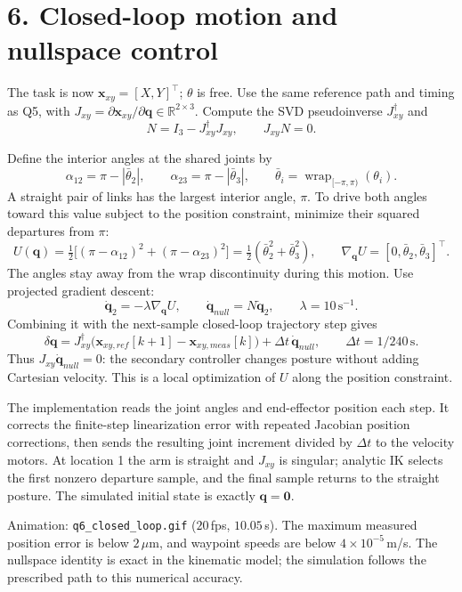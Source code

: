 \documentclass[11pt]{article}
\begin{document}
\newpage
\section*{6. Closed-loop motion and nullspace control}
The task is now $\mathbf{x}_{xy}=[X,Y]^\top$; $\theta$ is free. Use the same reference path and timing as Q5, with
$J_{xy}=\partial\mathbf{x}_{xy}/\partial\mathbf{q}\in\mathbb{R}^{2\times3}$.
Compute the SVD pseudoinverse $J_{xy}^\dagger$ and
\[
N=I_3-J_{xy}^\dagger J_{xy},\qquad J_{xy}N=0.
\]

Define the interior angles at the shared joints by
\[
\alpha_{12}=\pi-|\bar\theta_2|,\qquad
\alpha_{23}=\pi-|\bar\theta_3|,
\qquad \bar\theta_i=\operatorname{wrap}_{[-\pi,\pi)}(\theta_i).
\]
A straight pair of links has the largest interior angle, $\pi$. To drive both angles toward this value subject to the position constraint, minimize their squared departures from $\pi$:
\[
U(\mathbf{q})=\tfrac12\big[(\pi-\alpha_{12})^2+(\pi-\alpha_{23})^2\big]
=\tfrac12(\bar\theta_2^2+\bar\theta_3^2),\qquad
\nabla_{\mathbf{q}}U=[0,\bar\theta_2,\bar\theta_3]^\top.
\]
The angles stay away from the wrap discontinuity during this motion. Use projected gradient descent:
\[
\dot{\mathbf{q}}_2=-\lambda\nabla_{\mathbf{q}}U,\qquad
\dot{\mathbf{q}}_{null}=N\dot{\mathbf{q}}_2,\qquad \lambda=10\,\mathrm{s}^{-1}.
\]
Combining it with the next-sample closed-loop trajectory step gives
\[
\delta\mathbf{q}
=J_{xy}^\dagger\big(\mathbf{x}_{xy,ref}[k+1]-\mathbf{x}_{xy,meas}[k]\big)
+\Delta t\,\dot{\mathbf{q}}_{null},\qquad \Delta t=1/240\,\mathrm{s}.
\]
Thus $J_{xy}\dot{\mathbf{q}}_{null}=0$: the secondary controller changes posture without adding Cartesian velocity. This is a local optimization of $U$ along the position constraint.

The implementation reads the joint angles and end-effector position each step. It corrects the finite-step linearization error with repeated Jacobian position corrections, then sends the resulting joint increment divided by $\Delta t$ to the velocity motors. At location 1 the arm is straight and $J_{xy}$ is singular; analytic IK selects the first nonzero departure sample, and the final sample returns to the straight posture. The simulated initial state is exactly $\mathbf{q}=\mathbf{0}$.

Animation: \texttt{q6\_closed\_loop.gif} ($20$\,fps, $10.05$\,s). The maximum measured position error is below $2\,\mu$m, and waypoint speeds are below $4\times10^{-5}$\,m/s. The nullspace identity is exact in the kinematic model; the simulation follows the prescribed path to this numerical accuracy.
\end{document}

